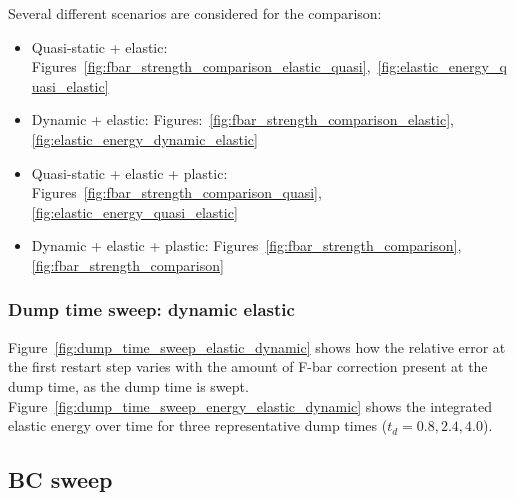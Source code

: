 Several different scenarios are considered for the comparison:
\begin{itemize}
    \item Quasi-static + elastic: Figures~\ref{fig:fbar_strength_comparison_elastic_quasi},~\ref{fig:elastic_energy_quasi_elastic}
    \item Dynamic + elastic: Figures:~\ref{fig:fbar_strength_comparison_elastic},\ref{fig:elastic_energy_dynamic_elastic}
    \item Quasi-static + elastic + plastic: Figures~\ref{fig:fbar_strength_comparison_quasi},\ref{fig:elastic_energy_quasi_elastic}
    \item Dynamic + elastic + plastic: Figures~\ref{fig:fbar_strength_comparison},\ref{fig:fbar_strength_comparison}
\end{itemize}

% 

% 













\FloatBarrier{}
\newpage{}
\subsubsection{Dump time sweep: dynamic elastic}

Figure~\ref{fig:dump_time_sweep_elastic_dynamic} shows how the relative error at the first restart step varies with the amount of F-bar correction present at the dump time, as the dump time is swept. Figure~\ref{fig:dump_time_sweep_energy_elastic_dynamic} shows the integrated elastic energy over time for three representative dump times ($t_d = 0.8, 2.4, 4.0$).




\FloatBarrier{}
\newpage{}
\subsection{BC sweep}







\FloatBarrier{}
